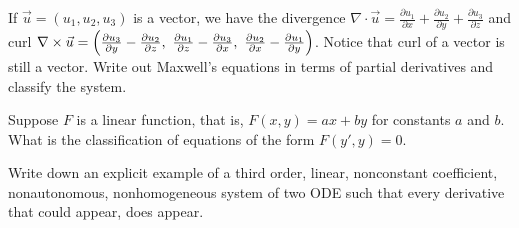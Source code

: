 \begin{exercise}
	If $\vec{u} = (u_1,u_2,u_3)$ is a vector, we have the divergence
	$\nabla \cdot \vec{u} =
	\frac{\partial u_1}{\partial x} +
	\frac{\partial u_2}{\partial y} +
	\frac{\partial u_3}{\partial z}$ and curl
	$\nabla \times \vec{u} =
	\Bigl(
	\frac{\partial u_3}{\partial y} - \frac{\partial u_2}{\partial z} , ~
	\frac{\partial u_1}{\partial z} - \frac{\partial u_3}{\partial x} , ~
	\frac{\partial u_2}{\partial x} - \frac{\partial u_1}{\partial y} \Bigr)$.
	Notice that curl of a vector is still a vector.  Write out Maxwell's
	equations in terms of partial derivatives and classify the system.
\end{exercise}

\begin{exercise}
	Suppose $F$ is a linear function, that is,
	$F(x,y) = ax+by$ for constants $a$ and $b$.  What is the
	classification of equations of the form $F(y',y) = 0$.
\end{exercise}

\begin{exercise}
	Write down an explicit example of a third order, linear, nonconstant coefficient,
	nonautonomous, nonhomogeneous system of two ODE such that every derivative
	that could appear, does appear.
\end{exercise}

